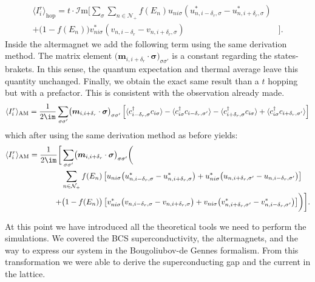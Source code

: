\documentclass[../main.tex]{subfile}
\begin{document}
\begin{equation}
    \begin{aligned}
        \langle I_i^r\rangle_{\text{hop}} = t\cdot\mathcal{I}\text{m}\biggl[ \sum_{\sigma}\sum_{n\in\mathcal{N}_+} 
            f(E_n)u_{ni\sigma}\left(u_{n,i-\delta_r,\sigma}^{\ast} - u_{n,i+\delta_r,\sigma}^{\ast}\right) &\\
            +\bigl(1-f(E_n)\bigr) v_{ni\sigma}^{\ast}\left(v_{n,i-\delta_r} - v_{n,i+\delta_r,\sigma}\right)&\biggr].
    \end{aligned}
\end{equation}
Inside the altermagnet we add the following term using the same derivation method. The matrix element $\bigl(\bm{m}_{i,i+\delta_r}\cdot\bm{\sigma}\bigr)_{\sigma\sigma'}$ is a constant regarding
the states-brakets. In this sense, the quantum expectation and thermal average leave this quantity unchanged. Finally, we obtain the exact
same result than a $t$ hopping but with a prefactor. This is consistent with the observation already made.
\begin{equation*}
    \begin{aligned}
    \langle I_i^r\rangle_{\text{AM}} = \frac{1}{2\im}\sum_{\sigma\sigma'}\bigl(\bm{m}_{i,i+\delta_r}\cdot\bm{\sigma}\bigr)_{\sigma\sigma'}\left[
        \langle c_{i-\delta_{r},\sigma}^{\dagger} c_{i\sigma}\rangle
        -\langle c_{i\sigma}^{\dagger}            c_{i-\delta_{r},\sigma'}\rangle
        -\langle c_{i+\delta_{r},\sigma}^{\dagger} c_{i\sigma}\rangle
        +\langle c_{i\sigma}^{\dagger}            c_{i+\delta_{r},\sigma'}\rangle\right]
\end{aligned}
\end{equation*}
which after using the same derivation method as before yields:
\begin{equation}
    \begin{aligned}
        \langle I_i^r\rangle_{\text{AM}} = \frac{1}{2\im}\biggl[& \sum_{\sigma\sigma'}\bigl(\bm{m}_{i,i+\delta_r}\cdot\bm{\sigma}\bigr)_{\sigma\sigma'}\biggl(\\
&\sum_{n\in\mathcal{N}_+} f(E_n)                \left[u_{ni\sigma}       \bigl(u_{n,i-\delta_r,\sigma}^{\ast} - u_{n,i+\delta_r,\sigma}^{\ast}\bigr) + u_{ni\sigma}^{\ast}\bigl(u_{n,i+\delta_r,\sigma'}        - u_{n,i-\delta_r,\sigma'}       \bigr)\right]\\
                         +&\bigl(1-f(E_n)\bigr) \left[v_{ni\sigma}^{\ast}\bigl(v_{n,i-\delta_r,\sigma}        - v_{n,i+\delta_r,\sigma}       \bigr) + v_{ni\sigma}       \bigl(v_{n,i+\delta_r,\sigma'}^{\ast} - v_{n,i-\delta_r,\sigma'}^{\ast}\bigr)\right]\biggr)\biggr].\\
    \end{aligned}
\end{equation}

At this point we have introduced all the theoretical tools we need to perform the simulations. We covered the BCS superconductivity, the altermagnets, and the way to express
our system in the Bougoliubov-de Gennes formalism. From this transformation we were able to derive the superconducting gap and the current in the lattice. 
\end{document}
